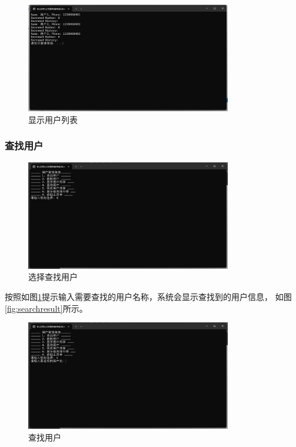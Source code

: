 \documentclass[12pt,twoside]{ctexart}
\begin{document}
\begin{figure}[H]
    \centering
    \includegraphics[width=0.8\textwidth]{showusers.png}
    \caption{显示用户列表}
\end{figure}

\subsubsection{查找用户}

\begin{figure}[H]
    \centering
    \includegraphics[width=0.8\textwidth]{selectsearchuser.png}
    \caption{选择查找用户}
\end{figure}

按照如图\ref{fig:searchuser}提示输入需要查找的用户名称，系统会显示查找到的用户信息，
如图\ref{fig:searchresult}所示。
\begin{figure}[H]
    \centering
    \includegraphics[width=0.8\textwidth]{searchuser.png}
    \caption{查找用户}
    \label{fig:searchuser}
\end{figure}
\end{document}
